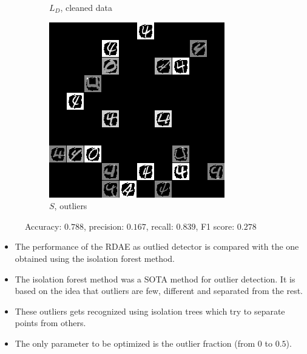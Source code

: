 \documentclass{beamer}
\theoremstyle{plain}
\theoremstyle{definition}
\theoremstyle{remark}
\begin{document}
\begin{frame}
\begin{figure}
\begin{subfigure}[b]{0.3\textwidth}
			\caption{$L_D$, cleaned data}
		\end{subfigure}
		\hfill
		\begin{subfigure}[b]{0.3\textwidth}
			\centering
			\includegraphics[width=\textwidth]{Images/l21S_4.png}
			\caption{$S$, outliers}
		\end{subfigure}
		   \caption{Accuracy: $0.788$, precision: $0.167$, recall: $0.839$, F1 score: $0.278$}
   \end{figure}
\end{frame}

\begin{frame}
	\begin{itemize}
		\item The performance of the RDAE as outlied detector is compared with the one obtained using the isolation forest method.
		\item The isolation forest method was a SOTA method for outlier detection. It is based on the idea that outliers are few, different and separated from the rest.
		\item These outliers gets recognized using isolation trees which try to separate points from others.
		\item The only parameter to be optimized is the outlier fraction (from $0$ to $0.5$).
	\end{itemize}
\end{frame}
\end{document}

